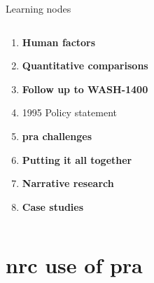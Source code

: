 \documentclass[aspectratio=1610,pdftex,dvipsnames,compress,xcolor={dvipsnames}]{beamer}
\newcommand{\acs}{\acrshort} %
\begin{document}
\begin{frame}{Learning nodes}
\begin{columns}[t]
        \begin{column}{0.50\textwidth}
            \begin{enumerate}[series=outerlist,topsep=0pt,itemsep=1pt,leftmargin=*,label=(\arabic*)]
                \item[]\hfill\textbf{Human factors}
                    \vspace{0.15in}
                \item[]\hfill\textbf{Quantitative comparisons}
                    \vspace{0.15in}
                \item[]\hfill\textbf{Follow up to WASH-1400}
                \item[]\hfill 1995 Policy statement
                    \vspace{0.15in}
                \item[]\hfill\textbf{\acs{pra} challenges}
                    \vspace{0.15in}
                \item[]\hfill\textbf{Putting it all together}
                    \vspace{0.15in}
                \item[]\hfill\textbf{Narrative research}
                    \vspace{0.15in}
                \item[]\hfill\textbf{Case studies}
            \end{enumerate}
        \end{column}

    \end{columns}
\end{frame}


\section{\acs{nrc} use of \acs{pra}}
\end{document}
